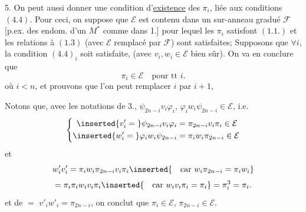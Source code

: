 5. On peut aussi donner une condition d'\uline{existence} des $\pi_i$, liée aux conditions $(4.4)$. Pour ceci, on suppose que $\mathcal E$ est contenu dans un sur-anneau gradué $\mathcal F$ [p.ex.  des endom. d'un $M^*$ comme dans 1.] pour lequel les $\pi_i$ satisfont $(1.1.)$ et les relations  à $(1.3)$ (avec $\mathcal E$ remplacé par $\mathcal F$) sont satisfaites;  Supposons que $\forall i$, la condition $(4.4)_i$ soit satisfaite, (avec $v_i,w_i\in\mathcal E$ bien sûr). On va en conclure que
\[
\pi_i\in\mathcal E\quad\text{pour tt }i.
\tag{5.1}
\]
 où $i<n$, et prouvons que l'on peut remplacer $i$ par $i+1$, 

Notons que, avec les notations de 3.,    $\psi_{2n-i}v_i\varphi_i$, $\varphi_iw_i\psi_{2n-i}\in\mathcal E$, i.e.
\[
\left\{\begin{aligned}
\inserted{v'_i={}}\psi_{2n-i}v_i\varphi_i&=\pi_{2n-i}v_i\pi_i\in\mathcal E\\
\inserted{w'_i={}}\varphi_iw_i\psi_{2n-i}&=\pi_iw_i\pi_{2n-i}\in\mathcal E
\end{aligned}\right.
\]
et  
\[
w'_iv'_i=\pi_iw_i\pi_{2n-i}v_i\pi_i
\inserted{\quad\text{car }w_i\pi_{2n-i}=\pi_iw_i}\]
\[
=\pi_i\pi_iw_iv_i\pi_i
\inserted{\quad\text{car }w_iv_i\pi_i=\pi_i}
=\pi_i^3=\pi_i.
\]
et de $=$  $v'_iw'_i=\pi_{2n-i}$, on conclut que $\pi_i\in\mathcal E$, $\pi_{2n-i}\in\mathcal E$.
